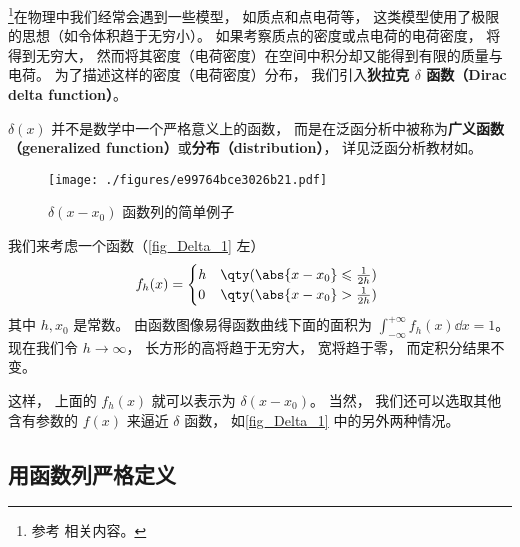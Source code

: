 
\footnote{参考 \cite{Arfken} 相关内容。}在物理中我们经常会遇到一些模型， 如质点和点电荷等， 这类模型使用了极限的思想（如令体积趋于无穷小）。 如果考察质点的密度或点电荷的电荷密度， 将得到无穷大， 然而将其密度（电荷密度）在空间中积分却又能得到有限的质量与电荷。 为了描述这样的密度（电荷密度）分布， 我们引入\textbf{狄拉克 $\delta$ 函数（Dirac delta function）}。

$\delta(x)$ 并不是数学中一个严格意义上的函数， 而是在泛函分析中被称为\textbf{广义函数（generalized function）}或\textbf{分布（distribution）}， 详见泛函分析教材如\cite{Zeidler}。

\begin{figure}[ht]
\centering
\texttt{[image: ./figures/e99764bce3026b21.pdf]}
\caption{$\delta(x - x_0)$ 函数列的简单例子} \label{fig_Delta_1}
\end{figure}

我们来考虑一个函数（\autoref{fig_Delta_1} 左）
\begin{equation}\label{eq_Delta_6}
f_h(x) =
\begin{cases}
h & \qty( \abs{x - x_0} \leqslant \frac{1}{2h} )\\
0 & \qty( \abs{x - x_0} > \frac{1}{2h} )
\end{cases}~
\end{equation}
其中 $h, x_0$ 是常数。 由函数图像易得函数曲线下面的面积为 $\int_{-\infty}^{+\infty} f_h(x) \dd{x} = 1$。 现在我们令 $h \to \infty$， 长方形的高将趋于无穷大， 宽将趋于零， 而定积分结果不变。

这样， 上面的 $f_h(x)$ 就可以表示为 $\delta(x - x_0)$。 当然， 我们还可以选取其他含有参数的 $f(x)$ 来逼近 $\delta$ 函数， 如\autoref{fig_Delta_1} 中的另外两种情况。

\subsection{用函数列严格定义}

